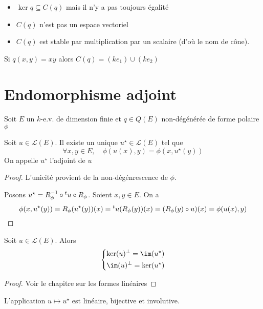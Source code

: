 \begin{rem}
\begin{itemize}
    \item $\ker q\subseteq C(q)$ mais il n'y a pas toujours égalité
    \item  $C(q)$ n'est pas un espace vectoriel
    \item  $C(q)$ est stable par multiplication par un scalaire (d'où le nom de cône).
\end{itemize}
\end{rem}

\begin{ex}
    Si $q(x, y)=xy$ alors  $C(q)=(ke_1)\cup (ke_2)$
\end{ex}

\section{Endomorphisme adjoint}

Soit $E$ un  $k$-e.v. de dimension finie et  $q \in  Q(E)$ non-dégénérée de forme polaire $\phi$

 \begin{defprop}
     Soit $u \in  \mathcal L(E)$. Il existe un unique $u^\star \in \mathcal  L(E)$ tel que \[
         \forall  x, y \in  E, \quad  \phi(u(x), y)=\phi(x, u^\star(y))
     \] 
     On appelle $u^\star$ l'adjoint de  $u$
\end{defprop}

\begin{proof}
L'unicité provient de la non-dégénrescence de $\phi$.

Posons  $u^\star = R_\phi ^{-1} \circ {}^t u\circ R_\phi$. Soient $x, y \in  E$. On a \[
    \phi(x, u^\star(y))=R_\phi(u^\star(y))(x)={}^t u(R_\phi(y))(x)=(R_\phi(y)\circ u)(x)=\phi(u(x), y)
\] 
\end{proof}

\begin{prop}
    Soit $u \in \mathcal  L(E)$. Alors \[
    \begin{dcases}
        \ker(u)^\bot=\im(u^\star)\\
        \im(u)^\bot=\ker(u^\star)
    \end{dcases}
    \] 
\end{prop}

\begin{proof}
Voir le chapitre sur les formes linéaires
\end{proof}

\begin{prop}
L'application $u\longmapsto u^\star$ est linéaire, bijective et involutive.
\end{prop}

